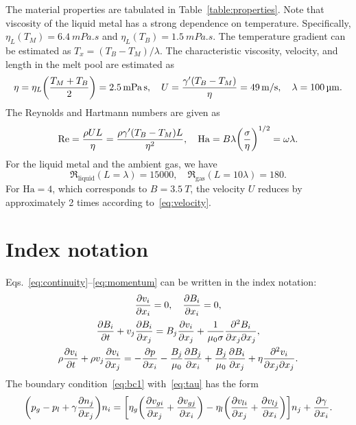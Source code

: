 \documentclass{article}
\newcommand{\Ha}{\mathrm{Ha}}
\begin{document}
The material properties are tabulated in Table~\ref{table:properties}.
Note that viscosity of the liquid metal has a strong dependence on temperature.
Specifically, $\eta_L(T_M) = \SI{6.4}{mPa.s}$ and $\eta_L(T_B) = \SI{1.5}{mPa.s}$.
The temperature gradient can be estimated as $T_x=(T_B-T_M)/\lambda$.
The characteristic viscosity, velocity, and length in the melt pool are estimated as
\begin{equation}
    \eta = \eta_L\qty(\frac{T_M+T_B}{2}) = \SI{2.5}{mPa.s}, \quad
    U = \frac{\gamma'(T_B - T_M)}{\eta} = \SI{49}{m/s}, \quad
    \lambda = \SI{100}{\um}.
\end{equation}
The Reynolds and Hartmann numbers are given as
\begin{equation}
    \Re = \frac{\rho U L}{\eta} = \frac{\rho \gamma'(T_B - T_M) L}{\eta^2}, \quad
    \Ha = B\lambda\qty(\frac{\sigma}{\eta})^{1/2} = \omega\lambda.
\end{equation}
For the liquid metal and the ambient gas, we have
\begin{equation}
    \Re_\text{liquid}(L=\lambda) = 15000, \quad
    \Re_\text{gas}(L=10\lambda) = 180.
\end{equation}
For $\Ha = 4$, which corresponds to $B = \SI{3.5}{T}$,
the velocity $U$ reduces by approximately 2 times according to~\eqref{eq:velocity}.

\appendix

\section{Index notation}

Eqs.~\eqref{eq:continuity}--\eqref{eq:momentum} can be written in the index notation:
\begin{gather}
    \pdv{v_i}{x_i} = 0, \quad \pdv{B_i}{x_i} = 0, \label{eq:continuityI}\\
    \pdv{B_i}{t} + v_j\pdv{B_i}{x_j} = B_j\pdv{v_i}{x_j} + \frac1{\mu_0\sigma} \pdv[2]{B_i}{x_j}{x_j}, \label{eq:BI}\\
    \rho\pdv{v_i}{t} + \rho v_j\pdv{v_i}{x_j}
    = -\pdv{p}{x_i} - \frac{B_j}{\mu_0}\pdv{B_j}{x_i} + \frac{B_j}{\mu_0}\pdv{B_i}{x_j} + \eta\pdv[2]{v_i}{x_j}{x_j}. \label{eq:momentumI}
\end{gather}
The boundary condition~\eqref{eq:bc1} with~\eqref{eq:tau} has the form
\begin{equation}\label{eq:bc1I}
    \qty(p_g - p_l + \gamma\pdv{n_j}{x_j})n_i
    = \qty[
        \eta_g\qty( \pdv{v_{gi}}{x_j} + \pdv{v_{gj}}{x_i} )
      - \eta_l\qty( \pdv{v_{li}}{x_j} + \pdv{v_{lj}}{x_i} )
    ]n_j + \pdv{\gamma}{x_i}.
\end{equation}

\printbibliography
\end{document}
